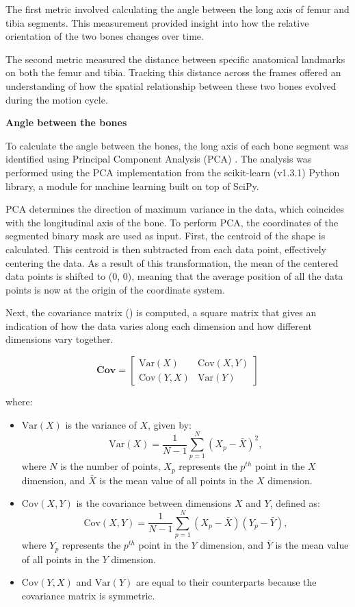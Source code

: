 \documentclass{micro-econ-thesis}
\begin{document}
The first metric involved calculating the angle between the long axis of femur and tibia segments. This measurement provided insight into how the relative orientation of the two bones changes over time.

The second metric measured the distance between specific anatomical landmarks on both the femur and tibia. Tracking this distance across the frames offered an understanding of how the spatial relationship between these two bones evolved during the motion cycle. 

\textbf{Angle between the bones}

To calculate the angle between the bones, the long axis of each bone segment was identified using Principal Component Analysis (PCA) \parencite{jolliffe_principal_2004}. The analysis was performed using the PCA implementation from the scikit-learn (v1.3.1) Python library, a module for machine learning built on top of SciPy.

PCA determines the direction of maximum variance in the data, which coincides with the longitudinal axis of the bone. To perform PCA, the coordinates of the segmented binary mask are used as input. First, the centroid of the shape is calculated. This centroid is then subtracted from each data point, effectively centering the data. As a result of this transformation, the mean of the centered data points is shifted to (0, 0), meaning that the average position of all the data points is now at the origin of the coordinate system. 

Next, the covariance matrix () is computed, a square matrix that gives an indication of how the data varies along each dimension and how different dimensions vary together. 

\begin{equation}
	\mathbf{Cov} = 
	\begin{bmatrix}
		\mathrm{Var}(X) & \mathrm{Cov}(X,Y) \\
		\mathrm{Cov}(Y,X) & \mathrm{Var}(Y)
	\end{bmatrix}
	\label{eq:cov}
\end{equation}

where:
\begin{itemize}
	\item \(\mathrm{Var}(X)\) is the variance of \(X\), given by:
	\[
	\mathrm{Var}(X) = \frac{1}{N-1} \sum_{p=1}^{N} (X_{p} - \bar{X})^2,
	\]
	where \(N\) is the number of points, \(X_{p}\) represents the \(p^{th}\) point in the \(X\) dimension, and \(\bar{X}\) is the mean value of all points in the \(X\) dimension. 
	\item \(\mathrm{Cov}(X,Y)\) is the covariance between dimensions \(X\) and \(Y\), defined as:
	\[
	\mathrm{Cov}(X,Y) = \frac{1}{N-1} \sum_{p=1}^{N} (X_{p} - \bar{X})(Y_{p} - \bar{Y}),
	\]
	where \(Y_{p}\) represents the \(p^{th}\) point in the \(Y\) dimension, and \(\bar{Y}\) is the mean value of all points in the \(Y\) dimension.
	
	\item \(\mathrm{Cov}(Y,X)\) and  \(\mathrm{Var}(Y)\) are equal to their counterparts because the covariance matrix is symmetric. 

\end{itemize}
\end{document}
